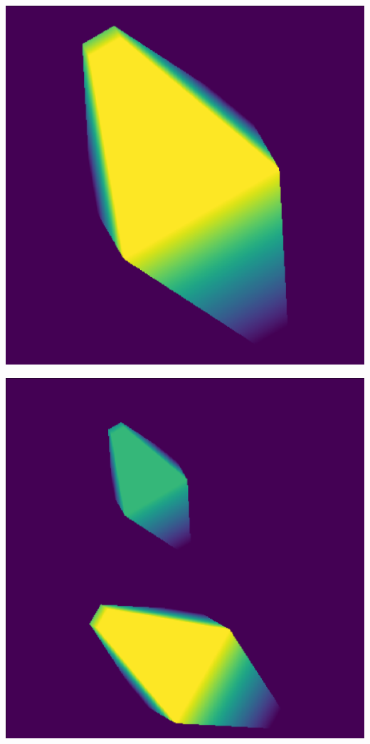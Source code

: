\documentclass{article}
\begin{document}
\begin{center}
    \begin{minipage}{0.3\textwidth}
        \includegraphics*[width=\linewidth]{../images/bipiramid_singola.png}
    \end{minipage}
    \hfill
    \begin{minipage}{0.3\textwidth}
        \includegraphics*[width=\linewidth]{../images/bipiramid_doppia.png}

\end{minipage}
\end{center}
\end{document}
